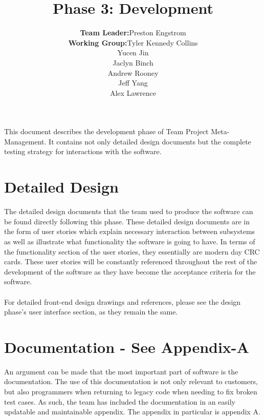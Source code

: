 \documentclass[14pt]{article}
\title{Phase 3: Development}
\author{ \begin{tabular}{rl}
		\textbf{Team Leader:} & Preston Engstrom \\
		\textbf{Working Group:} & Tyler Kennedy Collins\\ & Yucen Jin \\ & Jaclyn Binch  \\ & Andrew Rooney \\ & Jeff Yang \\ & Alex Lawrence
	\end{tabular}}
\date{}
\begin{document}
\maketitle

\thispagestyle{fancy}

\abstract
This document describes the development phase of Team Project Meta-Management. It contains not only detailed design documents but the complete testing strategy for interactions with the software.

\section{Detailed Design}
The detailed design documents that the team used to produce the software can be found directly following this phase. These detailed design documents are in the form of user stories which explain necessary interaction between subsystems as well as illustrate what functionality the software is going to have. In terms of the functionality section of the user stories, they essentially are modern day CRC cards. These user stories will be constantly referenced throughout the rest of the development of the software as they have become the acceptance criteria for the software. \\ \\
For detailed front-end design drawings and references, please see the design phase's user interface section, as they remain the same.

\section{Documentation - See Appendix-A}
An argument can be made that the most important part of software is the documentation. The use of this documentation is not only relevant to customers, but also programmers when returning to legacy code when needing to fix broken test cases. As such, the team has included the documentation in an easily updatable and maintainable appendix. The appendix in particular is appendix A.
\end{document}
